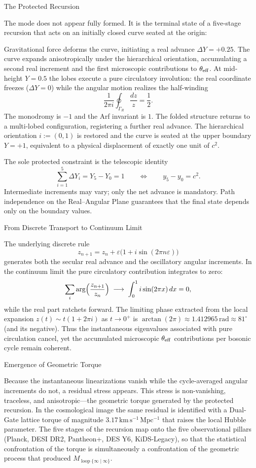 The Protected Recursion

The mode does not appear fully formed. It is the terminal state of a five-stage recursion that acts on an initially closed curve seated at the origin:

Gravitational force deforms the curve, initiating a real advance \(\Delta Y = +0.25\).
The curve expands anisotropically under the hierarchical orientation, accumulating a second real increment and the first microscopic contributions to \(\theta_{\rm eff}\).
At mid-height \(Y=0.5\) the lobes execute a pure circulatory involution: the real coordinate freezes (\(\Delta Y=0\)) while the angular motion realizes the half-winding
   \[
   \frac{1}{2\pi i}\oint_{\Gamma_R}\frac{dz}{z}=\frac12.
   \]
   The monodromy is \(-1\) and the Arf invariant is \(1\).
The folded structure returns to a multi-lobed configuration, registering a further real advance.
The hierarchical orientation \(i:=(0,1)\) is restored and the curve is seated at the upper boundary \(Y=+1\), equivalent to a physical displacement of exactly one unit of \(c^2\).

The sole protected constraint is the telescopic identity
\[
\sum_{i=1}^{5}\Delta Y_i = Y_5-Y_0=1\qquad\Longleftrightarrow\qquad y_5-y_0=c^2.
\]
Intermediate increments may vary; only the net advance is mandatory. Path independence on the Real–Angular Plane guarantees that the final state depends only on the boundary values.

From Discrete Transport to Continuum Limit

The underlying discrete rule
\[
z_{n+1}=z_n+\varepsilon\bigl(1+i\sin(2\pi n\varepsilon)\bigr)
\]
generates both the secular real advance and the oscillatory angular increments. In the continuum limit the pure circulatory contribution integrates to zero:
\[
\sum_i\arg\Bigl(\frac{z_{n+1}}{z_n}\Bigr)\;\longrightarrow\;\int_0^1 i\sin(2\pi x)\,dx=0,
\]
while the real part ratchets forward. The limiting phase extracted from the local expansion \(z(t)\sim t(1+2\pi i)\) as \(t\to0^+\) is \(\arctan(2\pi)\approx1.412965\,\mathrm{rad}\approx81^\circ\) (and its negative). Thus the instantaneous eigenvalues associated with pure circulation cancel, yet the accumulated microscopic \(\theta_{\rm eff}\) contributions per bosonic cycle remain coherent.

Emergence of Geometric Torque

Because the instantaneous linearizations vanish while the cycle-averaged angular increments do not, a residual stress appears. This stress is non-vanishing, traceless, and anisotropic—the geometric torque generated by the protected recursion. In the cosmological image the same residual is identified with a Dual-Gate lattice torque of magnitude \(3.17\,\mathrm{km\,s^{-1}\,Mpc^{-1}}\) that raises the local Hubble parameter. The five stages of the recursion map onto the five observational pillars (Planck, DESI DR2, Pantheon+, DES Y6, KiDS-Legacy), so that the statistical confrontation of the torque is simultaneously a confrontation of the geometric process that produced \(M_{\operatorname{loop}\{\infty\mid\infty\}}\).

